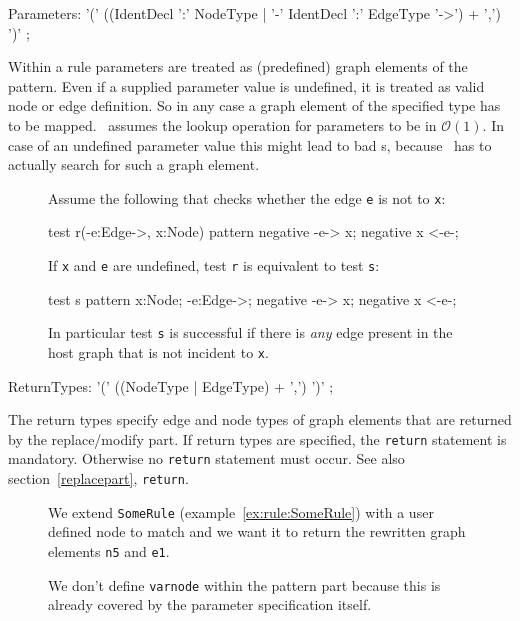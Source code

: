 \begin{rail}
  Parameters: '(' ((IdentDecl ':' NodeType | '-' IdentDecl ':' EdgeType '->') + ',') ')' ;
\end{rail}
Within a rule parameters are treated as (predefined) graph elements of the pattern. Even if a supplied parameter value is undefined, it is treated as valid node or edge definition. So in any case a graph element of the specified type has to be mapped. \GrG\ assumes the lookup operation for parameters to be in $\mathcal{O}(1)$. In case of an undefined parameter value this might lead to bad s, because \GrG\ has to actually search for such a graph element.
\begin{figure}[htbp]
\begin{example}
Assume the following  that checks whether the edge \texttt{e} is not  to \texttt{x}:
\begin{grgen}
test r(-e:Edge->, x:Node) {
  pattern {
    negative {
      -e-> x;
    }
    negative {
      x <-e-;
    }
  }
}
\end{grgen}
If \texttt{x} and \texttt{e} are undefined, test \texttt{r} is equivalent to test \texttt{s}:
\begin{grgen}
test s {
  pattern {
    x:Node;
    -e:Edge->;
    negative {
      -e-> x;
    }
    negative {
      x <-e-;
    }
  }
}
\end{grgen}
In particular test \texttt{s} is successful if there is \emph{any} edge present in the host graph that is not incident to \texttt{x}.
\end{example}
\end{figure}

\begin{rail}
  ReturnTypes: '(' ((NodeType | EdgeType) + ',') ')' ;
\end{rail}
The return types specify edge and node types of graph elements that are returned by the replace/modify part. If return types are specified, the \texttt{return} statement is mandatory. Otherwise no \texttt{return} statement must occur. See also section~\ref{replacepart}, \texttt{return}.
\begin{figure}[htbp]
\begin{example}\label{ex:rule:someruleext}
We extend \texttt{SomeRule} (example~\ref{ex:rule:SomeRule}) with a user defined node to match and we want it to return the rewritten graph elements \texttt{n5} and \texttt{e1}.
\begin{grgen}
  rule SomeRuleExt(varnode: Node): (Node, EdgeTypeB) {
    pattern {
      n1: NodeTypeA;
      ...
    }
    replace {
      varnode;
      ...  
      return(n5, e1);
      eval {
        ...
\end{grgen}
We don't define \texttt{varnode} within the pattern part because this is already covered by the parameter specification itself.
\end{example}
\end{figure}

